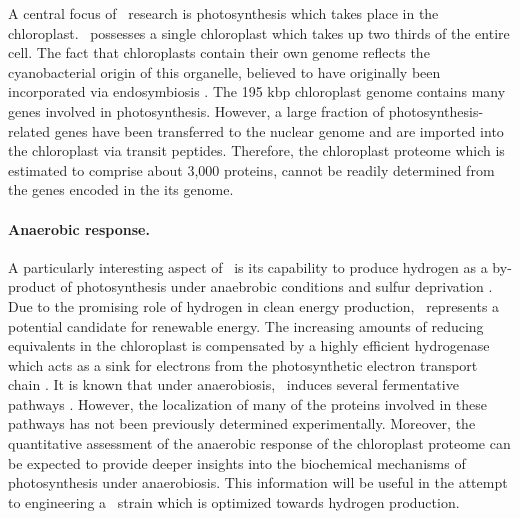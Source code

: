 A central focus of \cre~research is photosynthesis which takes place in the 
chloroplast.
\cre~possesses a single chloroplast which takes up two thirds of the entire cell.
The fact that chloroplasts contain their own genome reflects the cyanobacterial
origin of this organelle, believed to have originally been incorporated 
via endosymbiosis \citep{Gould2008}.
The 195 kbp chloroplast genome contains many genes involved in photosynthesis.
However, a large fraction of photosynthesis-related genes have been transferred
to the nuclear genome \citep{Blanchard2000} and are imported into the 
chloroplast via transit peptides.
Therefore, the chloroplast proteome which is estimated to comprise about 3,000
proteins, cannot be readily determined from the genes encoded in the its 
genome.

\paragraph{Anaerobic response.}

A particularly interesting aspect of \cre~is its capability to produce
hydrogen as a by-product of photosynthesis under anaebrobic conditions 
\citep{Greenbaum1982} and sulfur deprivation \citep{Fouchard2005}.
Due to the promising role of hydrogen in clean energy production, 
\cre~represents a potential candidate for renewable energy.
The increasing amounts of reducing equivalents in the chloroplast is
compensated by a highly efficient hydrogenase which acts as a sink for 
electrons from the photosynthetic electron transport chain 
\citep{Happe2002, Hemschemeier2011}.
It is known that under anaerobiosis, \cre~induces several fermentative
pathways \citep{Grossman2011}.
However, the localization of many of the proteins involved in these pathways
has not been previously determined experimentally.
Moreover, the quantitative assessment of the anaerobic response of the
chloroplast proteome can be expected to provide deeper insights into
the biochemical mechanisms of photosynthesis under anaerobiosis.
This information will be useful in the attempt to engineering a 
\cre~strain which is optimized towards hydrogen production.

% 
% 
% 

